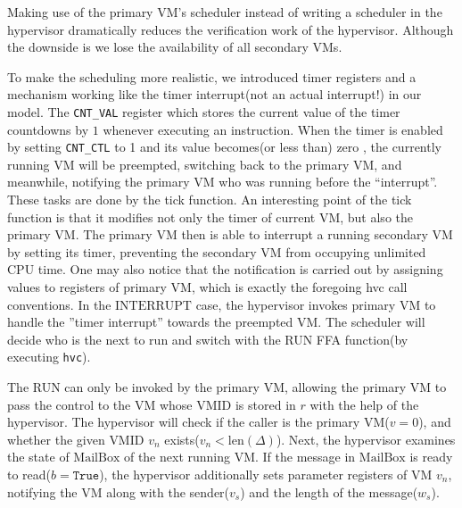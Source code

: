 \documentclass[a4paper]{article}
\newcommand*{\VMID}{\text{VMID}}
\newcommand*{\MB}{\text{MailBox}}
\newcommand*{\TIMER}{\text{Timer}}
\newcommand*{\INT}{\text{INTERRUPT}}
\newcommand*{\instr}[1]{\texttt{#1}}
\begin{document}
Making use of the primary VM's scheduler instead of writing a scheduler in the
hypervisor dramatically reduces the verification work of the hypervisor. Although
the downside is we lose the availability of all secondary VMs.

To make the scheduling more realistic, we introduced timer registers and a
mechanism working like the timer interrupt(not an actual interrupt!) in our
model. The \texttt{CNT\_VAL} register which stores the current value of the
timer countdowns by $1$ whenever executing an instruction. When the timer is
enabled by setting \texttt{CNT\_CTL} to 1 and its value becomes(or less than)
zero , the currently running VM will be preempted, switching back to the primary
VM, and meanwhile, notifying the primary VM who was running before the
``interrupt''. These tasks are done by the tick function. An interesting point
of the tick function is that it modifies not only the timer of current VM, but
also the primary VM. The primary VM then is able to interrupt a running
secondary VM by setting its timer, preventing the secondary VM from occupying
unlimited CPU time. One may also notice that the notification is carried out by
assigning values to registers of primary VM, which is exactly the foregoing hvc
call conventions.
In the $\INT$ case, the
hypervisor invokes primary VM to handle the ''timer interrupt'' towards the
preempted VM. The scheduler will decide who is the next to run and switch with
the RUN FFA function(by executing \instr{hvc}).


The RUN can only be invoked by the primary VM, allowing the
primary VM to pass the control to the VM whose $\VMID$ is stored in $r$ with the help of
the hypervisor. The hypervisor will check if the caller is the primary VM($v=0$),
and whether the given $\VMID$ $v_{n}$ exists($v_{n} < \text{len}(\Delta)$). Next, the hypervisor examines the state of
$\MB$ of the next running VM. If the message in $\MB$ is ready to read($b=\mathtt{True}$), the
hypervisor additionally sets parameter registers of VM $v_{n}$, notifying the VM
along with the sender($v_{s}$) and the length of the message($w_{s}$).
\end{document}
